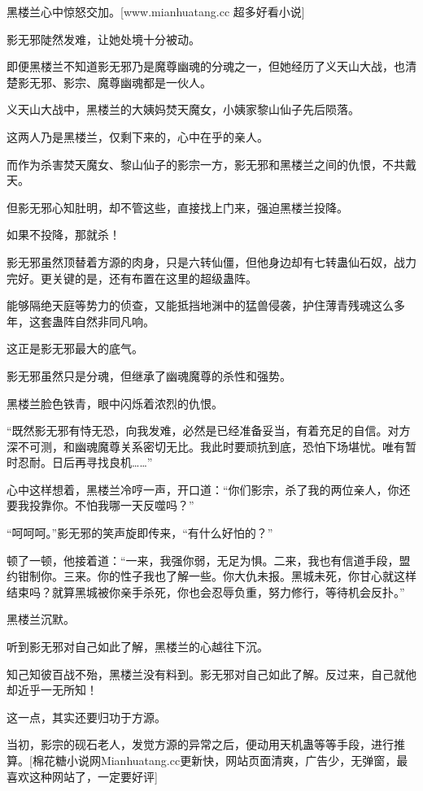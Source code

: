 
\begin{this_body}

黑楼兰心中惊怒交加。[www.mianhuatang.cc 超多好看小说]

影无邪陡然发难，让她处境十分被动。

即便黑楼兰不知道影无邪乃是魔尊幽魂的分魂之一，但她经历了义天山大战，也清楚影无邪、影宗、魔尊幽魂都是一伙人。

义天山大战中，黑楼兰的大姨妈焚天魔女，小姨家黎山仙子先后陨落。

这两人乃是黑楼兰，仅剩下来的，心中在乎的亲人。

而作为杀害焚天魔女、黎山仙子的影宗一方，影无邪和黑楼兰之间的仇恨，不共戴天。

但影无邪心知肚明，却不管这些，直接找上门来，强迫黑楼兰投降。

如果不投降，那就杀！

影无邪虽然顶替着方源的肉身，只是六转仙僵，但他身边却有七转蛊仙石奴，战力完好。更关键的是，还有布置在这里的超级蛊阵。

能够隔绝天庭等势力的侦查，又能抵挡地渊中的猛兽侵袭，护住薄青残魂这么多年，这套蛊阵自然非同凡响。

这正是影无邪最大的底气。

影无邪虽然只是分魂，但继承了幽魂魔尊的杀性和强势。

黑楼兰脸色铁青，眼中闪烁着浓烈的仇恨。

“既然影无邪有恃无恐，向我发难，必然是已经准备妥当，有着充足的自信。对方深不可测，和幽魂魔尊关系密切无比。我此时要顽抗到底，恐怕下场堪忧。唯有暂时忍耐。日后再寻找良机……”

心中这样想着，黑楼兰冷哼一声，开口道：“你们影宗，杀了我的两位亲人，你还要我投靠你。不怕我哪一天反噬吗？”

“呵呵呵。”影无邪的笑声旋即传来，“有什么好怕的？”

顿了一顿，他接着道：“一来，我强你弱，无足为惧。二来，我也有信道手段，盟约钳制你。三来。你的性子我也了解一些。你大仇未报。黑城未死，你甘心就这样结束吗？就算黑城被你亲手杀死，你也会忍辱负重，努力修行，等待机会反扑。”

黑楼兰沉默。

听到影无邪对自己如此了解，黑楼兰的心越往下沉。

知己知彼百战不殆，黑楼兰没有料到。影无邪对自己如此了解。反过来，自己就他却近乎一无所知！

这一点，其实还要归功于方源。

当初，影宗的砚石老人，发觉方源的异常之后，便动用天机蛊等等手段，进行推算。[棉花糖小说网Mianhuatang.cc更新快，网站页面清爽，广告少，无弹窗，最喜欢这种网站了，一定要好评]


\end{this_body}
